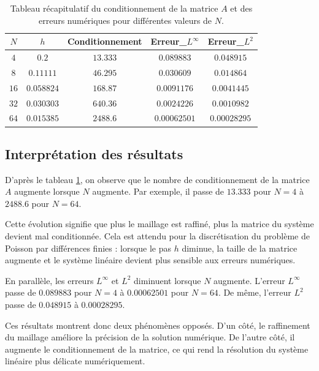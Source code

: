 \documentclass[12pt,a4paper]{article}
\begin{document}
\begin{table}[!htbp]
	\centering
	\renewcommand{\arraystretch}{1.3}
	\begin{tabular}{c c c c c}
		\hline
		$N$ & $h$ & Conditionnement & Erreur\_$L^\infty$ & Erreur\_$L^2$ \\
		\hline
		$4$  & $0.2$       & $13.333$  & $0.089883$   & $0.048915$  \\
		$8$  & $0.11111$   & $46.295$  & $0.030609$   & $0.014864$  \\
			$16$ & $0.058824$  & $168.87$  & $0.0091176$  & $0.0041445$ \\
		$32$ & $0.030303$  & $640.36$  & $0.0024226$  & $0.0010982$ \\
		$64$ & $0.015385$  & $2488.6$  & $0.00062501$ & $0.00028295$ \\
		\hline
	\end{tabular}
	\caption{Tableau récapitulatif du conditionnement de la matrice $A$ et des erreurs numériques pour différentes valeurs de $N$.}
	\label{tab:resultats_conditionnement_erreurs}
\end{table}


\subsection{Interprétation des résultats}

D'après le tableau \ref{tab:resultats_conditionnement_erreurs}, on observe que
le nombre de conditionnement de la matrice $A$ augmente lorsque $N$ augmente.
Par exemple, il passe de $13.333$ pour $N=4$ à $2488.6$ pour $N=64$.

Cette évolution signifie que plus le maillage est raffiné, plus la matrice du
système devient mal conditionnée. Cela est attendu pour la discrétisation du
problème de Poisson par différences finies : lorsque le pas $h$ diminue, la
taille de la matrice augmente et le système linéaire devient plus sensible aux
erreurs numériques.

En parallèle, les erreurs $L^\infty$ et $L^2$ diminuent lorsque $N$ augmente.
L'erreur $L^\infty$ passe de $0.089883$ pour $N=4$ à $0.00062501$ pour $N=64$.
De même, l'erreur $L^2$ passe de $0.048915$ à $0.00028295$.

Ces résultats montrent donc deux phénomènes opposés. D'un côté, le raffinement
du maillage améliore la précision de la solution numérique. De l'autre côté, il
augmente le conditionnement de la matrice, ce qui rend la résolution du système
linéaire plus délicate numériquement.
\end{document}
